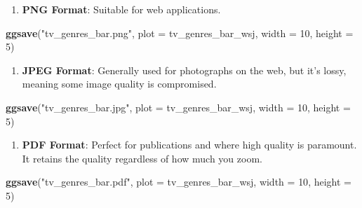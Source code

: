 \documentclass[
  b5paper]{book}
\newenvironment{Shaded}{\begin{snugshade}}{\end{snugshade}}
\newcommand{\AttributeTok}[1]{\textcolor[rgb]{0.13,0.29,0.53}{#1}}
\newcommand{\DecValTok}[1]{\textcolor[rgb]{0.00,0.00,0.81}{#1}}
\newcommand{\FunctionTok}[1]{\textcolor[rgb]{0.13,0.29,0.53}{\textbf{#1}}}
\newcommand{\NormalTok}[1]{#1}
\newcommand{\StringTok}[1]{\textcolor[rgb]{0.31,0.60,0.02}{#1}}
\providecommand{\tightlist}{%
  \setlength{\itemsep}{0pt}\setlength{\parskip}{0pt}}
\begin{document}
\begin{enumerate}
\def\labelenumi{\arabic{enumi}.}
\tightlist
\item
  \textbf{PNG Format}: Suitable for web applications.
\end{enumerate}

\begin{Shaded}
\begin{Highlighting}[]
\FunctionTok{ggsave}\NormalTok{(}\StringTok{"tv\_genres\_bar.png"}\NormalTok{, }\AttributeTok{plot =}\NormalTok{ tv\_genres\_bar\_wsj, }\AttributeTok{width =} \DecValTok{10}\NormalTok{, }\AttributeTok{height =} \DecValTok{5}\NormalTok{)}
\end{Highlighting}
\end{Shaded}

\begin{enumerate}
\def\labelenumi{\arabic{enumi}.}
\setcounter{enumi}{1}
\tightlist
\item
  \textbf{JPEG Format}: Generally used for photographs on the web, but it's lossy, meaning some image quality is compromised.
\end{enumerate}

\begin{Shaded}
\begin{Highlighting}[]
\FunctionTok{ggsave}\NormalTok{(}\StringTok{"tv\_genres\_bar.jpg"}\NormalTok{, }\AttributeTok{plot =}\NormalTok{ tv\_genres\_bar\_wsj, }\AttributeTok{width =} \DecValTok{10}\NormalTok{, }\AttributeTok{height =} \DecValTok{5}\NormalTok{)}
\end{Highlighting}
\end{Shaded}

\begin{enumerate}
\def\labelenumi{\arabic{enumi}.}
\setcounter{enumi}{2}
\tightlist
\item
  \textbf{PDF Format}: Perfect for publications and where high quality is paramount. It retains the quality regardless of how much you zoom.
\end{enumerate}

\begin{Shaded}
\begin{Highlighting}[]
\FunctionTok{ggsave}\NormalTok{(}\StringTok{"tv\_genres\_bar.pdf"}\NormalTok{, }\AttributeTok{plot =}\NormalTok{ tv\_genres\_bar\_wsj, }\AttributeTok{width =} \DecValTok{10}\NormalTok{, }\AttributeTok{height =} \DecValTok{5}\NormalTok{)}
\end{Highlighting}
\end{Shaded}
\end{document}
